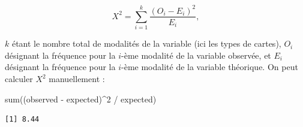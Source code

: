 \documentclass[
  letterpaper,
]{book}
\newenvironment{Shaded}{\begin{snugshade}}{\end{snugshade}}
\newcommand{\DecValTok}[1]{\textcolor[rgb]{0.68,0.00,0.00}{#1}}
\newcommand{\FunctionTok}[1]{\textcolor[rgb]{0.28,0.35,0.67}{#1}}
\newcommand{\NormalTok}[1]{\textcolor[rgb]{0.00,0.23,0.31}{#1}}
\newcommand{\SpecialCharTok}[1]{\textcolor[rgb]{0.37,0.37,0.37}{#1}}
\begin{document}
\[X^2 = \sum_{i=1}^{k} \frac{(O_{i} - E_{i})^2}{E_{i}},\]

\(k\) étant le nombre total de modalités de la variable (ici les types
de cartes), \(O_{i}\) désignant la fréquence pour la \(i\)-ème modalité
de la variable observée, et \(E_{i}\) désignant la fréquence pour la
\(i\)-ème modalité de la variable théorique. On peut calculer \(X^2\)
manuellement :

\begin{Shaded}
\begin{Highlighting}[]
\FunctionTok{sum}\NormalTok{((observed }\SpecialCharTok{{-}}\NormalTok{ expected)}\SpecialCharTok{\^{}}\DecValTok{2} \SpecialCharTok{/}\NormalTok{ expected)}
\end{Highlighting}
\end{Shaded}

\begin{verbatim}
[1] 8.44
\end{verbatim}
\end{document}
